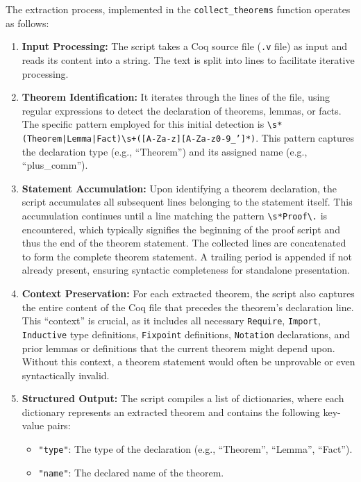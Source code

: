 The extraction process, implemented in the \texttt{collect\_theorems} function operates as follows:
\begin{enumerate}
    \item \textbf{Input Processing:} The script takes a Coq source file (\texttt{.v} file) as input and reads its content into a string. The text is split into lines to facilitate iterative processing.
    \item \textbf{Theorem Identification:} It iterates through the lines of the file, using regular expressions to detect the declaration of theorems, lemmas, or facts. The specific pattern employed for this initial detection is \texttt{\textbackslash s*(Theorem|Lemma|Fact)\textbackslash s+([A-Za-z][A-Za-z0-9\_']*)}. This pattern captures the declaration type (e.g., ``Theorem'') and its assigned name (e.g., ``plus\_comm'').
    \item \textbf{Statement Accumulation:} Upon identifying a theorem declaration, the script accumulates all subsequent lines belonging to the statement itself. This accumulation continues until a line matching the pattern \texttt{\textbackslash s*Proof\textbackslash .} is encountered, which typically signifies the beginning of the proof script and thus the end of the theorem statement. The collected lines are concatenated to form the complete theorem statement. A trailing period is appended if not already present, ensuring syntactic completeness for standalone presentation.
    \item \textbf{Context Preservation:} For each extracted theorem, the script also captures the entire content of the Coq file that precedes the theorem's declaration line. This ``context'' is crucial, as it includes all necessary \texttt{Require}, \texttt{Import}, \texttt{Inductive} type definitions, \texttt{Fixpoint} definitions, \texttt{Notation} declarations, and prior lemmas or definitions that the current theorem might depend upon. Without this context, a theorem statement would often be unprovable or even syntactically invalid.
    \item \textbf{Structured Output:} The script compiles a list of dictionaries, where each dictionary represents an extracted theorem and contains the following key-value pairs:
    \begin{itemize}
        \item \texttt{"type"}: The type of the declaration (e.g., ``Theorem'', ``Lemma'', ``Fact'').
        \item \texttt{"name"}: The declared name of the theorem.

\end{itemize}
\end{enumerate}

